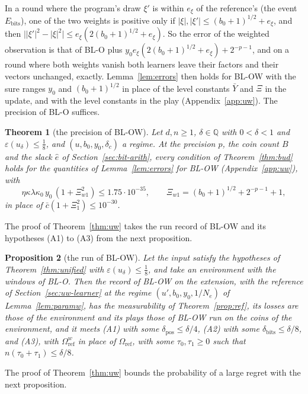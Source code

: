 \documentclass[11pt]{amsart}
\newtheorem{theorem}{Theorem}[section]
\newtheorem{proposition}[theorem]{Proposition}
\theoremstyle{definition}
\numberwithin{equation}{section}
\begin{document}
In a round where the program's draw $\xi'$ is within $e_\xi$ of the reference's (the event $E_{\mathrm{bits}}$), one of the two weights is positive only if $|\xi|,|\xi'|\le(b_0+1)^{1/2}+e_\xi$, and then $\bigl||\xi'|^2-|\xi|^2\bigr|\le e_\xi(2(b_0+1)^{1/2}+e_\xi)$. So the error of the weighted observation is that of BL-O plus $y_0e_\xi(2(b_0+1)^{1/2}+e_\xi)+2^{-p-1}$, and on a round where both weights vanish both learners leave their factors and their vectors unchanged, exactly. Lemma~\ref{lem:errors} then holds for BL-OW with the sure ranges $y_0$ and $(b_0+1)^{1/2}$ in place of the level constants $\bar Y$ and $\Xi$ in the update, and with the level constants in the play (Appendix~\ref{app:uw}). The precision of BL-O suffices.

\begin{theorem}[the precision of BL-OW]\label{thm:budw}
Let $d,n\ge1$, $\delta\in\mathbb Q$ with $0<\delta<1$ and $\varepsilon(u_\delta)\le\frac18$, and $(u,b_0,y_0,\delta_c)$ a regime. At the precision $p$, the coin count $B$ and the slack $\hat e$ of Section~\ref{sec:bit-arith}, every condition of Theorem~\ref{thm:bud} holds for the quantities of Lemma~\ref{lem:errors} for BL-OW (Appendix~\ref{app:uw}), with
\[
\eta\kappa\lambda\kappa_0\,y_0\,(1+\Xi_{w1}^2)\le1.75\cdot10^{-35},\qquad\Xi_{w1}=(b_0+1)^{1/2}+2^{-p-1}+1,
\]
in place of $\bar c(1+\Xi_1^2)\le10^{-30}$.
\end{theorem}
The proof of Theorem~\ref{thm:uw} takes the run record of BL-OW and its hypotheses (A1) to (A3) from the next proposition.

\begin{proposition}[the run of BL-OW]\label{prop:blrunw}
Let the input satisfy the hypotheses of Theorem~\ref{thm:unified} with $\varepsilon(u_\delta)\le\frac18$, and take an environment with the windows of BL-O. Then the record of BL-OW on the extension, with the reference of Section~\ref{sec:uw-learner} at the regime $(u',b_0,y_0,1/N_e)$ of Lemma~\ref{lem:paramw}, has the measurability of Theorem~\ref{prop:ref}, its losses are those of the environment and its plays those of BL-OW run on the coins of the environment, and it meets (A1) with some $\delta_{\mathrm{pos}}\le\delta/4$, (A2) with some $\delta_{\mathrm{bits}}\le\delta/8$, and (A3), with $\Omega^w_{\mathrm{ref}}$ in place of $\Omega_{\mathrm{ref}}$, with some $\tau_0,\tau_1\ge0$ such that $n(\tau_0+\tau_1)\le\delta/8$.
\end{proposition}
The proof of Theorem~\ref{thm:uw} bounds the probability of a large regret with the next proposition.
\end{document}

